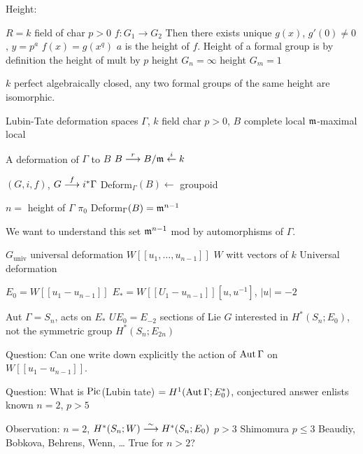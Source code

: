 Height: 

$R=k$ field of char $p>0$
$f: G_1 \to G_2$
Then there exists unique $g(x)$, $g'(0) \neq 0$, $y= p^a$
$f(x)= g(x^q)$
$a$ is the height of $f$.
Height of a formal group is by definition the height of mult by $p$
height $G_n= \infty$
height $G_m= 1$

\begin{thm}[Dieudonne]
$k$ perfect algebraically closed, any two formal groups of the same height are isomorphic. 
\end{thm}


Lubin-Tate deformation spaces
$\Gamma$, $k$ field char $p>0$, $B$ complete local $\mathfrak{m}$-maximal local

A deformation of $\Gamma$ to $B$ 
$B \stackrel{r}{\longrightarrow} B/\mathfrak{m} \stackrel{i}{\leftarrow} k$

$(G,i,f)$, $G \stackrel{f}{\longrightarrow} i^*\Gamma$
Deform$_\Gamma(B) \leftarrow$ groupoid

\begin{thm}[L-T]
$n=$ height of $\Gamma$
$\pi_0$ Deform$_\Gamma(B)= \mathfrak{m}^{n-1}$
\end{thm}

We want to understand this set $\mathfrak{m}^{n-1}$ mod by automorphisms of $\Gamma$.


$G_\text{univ}$ universal deformation 
$W[[u_1,\ldots,u_{n-1}]]$
$W$ witt vectors of $k$
Universal deformation


$E_0= W[[u_1-u_{n-1}]]$
$E_*= W[[U_1-u_{n-1}]][u,u^{-1}]$, $|u|= -2$

Aut $\Gamma= S_n$, acts on $E_*$
$UE_0= E_{-2}$ sections of Lie $G$
interested in $H^*(S_n; E_0)$, not the symmetric group
$H^*(S_n; E_{2n})$


Question: Can one write down explicitly the action of $\operatorname{Aut} \Gamma$ on $W[[u_1-u_{n-1}]]$.

Question: What is $\operatorname{Pic}$(Lubin tate) $=H^1(\operatorname{Aut} \Gamma; E_0^*)$, conjectured answer enlists known $n=2$, $p>5$


Observation: $n=2$, $H^*(S_n; W) \stackrel{\sim}{\longrightarrow} H^*(S_n;E_0)$
$p>3$ Shimomura
$p \leq 3$ Beaudiy, Bobkova, Behrens, Wenn, \dots
True for $n>2$?















